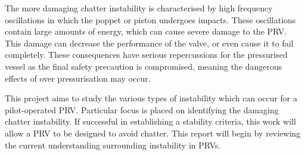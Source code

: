 The more damaging chatter instability is characterised by high frequency oscillations in which the poppet or piston undergoes impacts. These oscillations contain large amounts of energy, which can cause severe damage to the PRV. This damage can decrease the performance of the valve, or even cause it to fail completely. These consequences have serious repercussions for the pressurised vessel as the final safety precaution is compromised, meaning the dangerous effects of over pressurisation may occur.

This project aims to study the various types of instability which can occur for a pilot-operated PRV. Particular focus is placed on identifying the damaging chatter instability. If successful in establishing a stability criteria, this work will allow a PRV to be designed to avoid chatter. This report will begin by reviewing the current understanding surrounding instability in PRVs.

